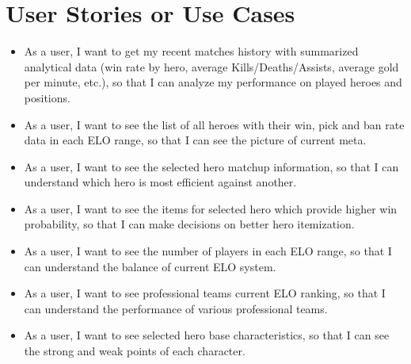 \section{User Stories or Use Cases}

\begin{itemize}

    \item As a user, I want to get my recent matches history with summarized analytical data (win rate by hero, average Kills/Deaths/Assists, average gold per minute, etc.),
    so that I can analyze my performance on played heroes and positions.
    \item As a user, I want to see the list of all heroes with their win, pick
    and ban rate data in each ELO range, so that I can see the picture of current meta.
    \item As a user, I want to see the selected hero matchup information,
    so that I can understand which hero is most efficient against another.
    \item As a user, I want to see the items for selected hero which provide higher win probability,
    so that I can make decisions on better hero itemization.
    \item As a user, I want to see the number of players in each ELO range,
    so that I can understand the balance of current ELO system.
    \item As a user, I want to see professional teams current ELO ranking,
    so that I can understand the performance of various professional teams.
    \item As a user, I want to see selected hero base characteristics,
    so that I can see the strong and weak points of each character.

\end{itemize}